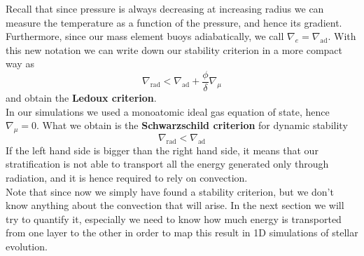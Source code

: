 \documentclass[11pt]{article}
\numberwithin{equation}{section}
\begin{document}
Recall that since pressure is always decreasing at increasing radius we can measure the temperature as a function of the pressure, and hence its gradient. Furthermore, since our mass element buoys adiabatically, we call $\nabla_e=\nabla_{\mathrm{ad}}$. 
With this new notation we can write down our stability criterion in a more compact way as
\begin{equation}\label{stabcritcomp}
	\nabla_{\mathrm{rad}} < \nabla_{\mathrm{ad}} + \frac{\phi}{\delta} \nabla_{\mu}
\end{equation}
and obtain the \textbf{Ledoux criterion}. \\
In our simulations we used a monoatomic ideal gas equation of state, hence $\nabla_{\mu}=0$.  What we obtain is the \textbf{Schwarzschild criterion} for dynamic stability
\begin{equation}\label{schwarzschild}
	\nabla_{\mathrm{rad}}<\nabla_{\mathrm{ad}}
\end{equation}
If the left hand side is bigger than the right hand side, it means that our stratification is not able to transport all the energy generated only through radiation, and it is hence required to rely on convection. \\
Note that since now we simply have found a stability criterion, but we don't know anything about the convection that will arise. In the next section we will try to quantify it, especially we need to know how much energy is transported from one layer to the other in order to map this result in 1D simulations of stellar evolution.
\end{document}
